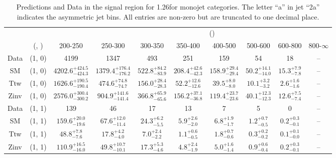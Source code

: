 \begin{table}[h!]
\tiny
\centering
\caption{Predictions and Data in the signal region for 1.26\ifb for monojet categories. The letter ``a'' in jet \eg ``2a''  indicates the asymmetric jet bins. All entries are non-zero but are truncated to one decimal place.\label{tab:predall_sig_comb_mono}}
\begin{tabular}
{cccccccccc}
	\hline\hline
&	&	& \multicolumn{8}{c}{\scalht (\gev)}\\ 
	&	 (\njet, \nb) & 200-250 & 250-300 & 300-350 & 350-400 & 400-500 & 500-600 & 600-800 & 800-$\infty$ \\ [0.8ex] 
\hline
	Data & (1, 0) & 4199 & 1347 & 493 & 251 & 159 & 54 & 18 & -- \\[0.5ex] 
	SM & (1, 0) & $4202.6^{+ 424.5 }_{- 424.3 }$ & $1379.4^{+ 176.4 }_{- 176.2 }$ & $522.8^{+ 84.2 }_{- 83.9 }$ & $208.4^{+ 42.6 }_{- 42.3 }$ & $158.9^{+ 29.4 }_{- 29.4 }$ & $50.2^{+ 14.1 }_{- 14.0 }$ & $15.3^{+ 7.9 }_{- 7.8 }$ & -- \\[0.5ex] 
	Ttw & (1, 0) & $1626.6^{+ 190.5 }_{- 190.4 }$ & $474.6^{+ 74.8 }_{- 74.7 }$ & $156.0^{+ 28.4 }_{- 28.3 }$ & $52.2^{+ 12.6 }_{- 12.6 }$ & $39.5^{+ 8.0 }_{- 8.0 }$ & $10.1^{+ 3.2 }_{- 3.2 }$ & $2.6^{+ 1.6 }_{- 1.6 }$ & -- \\[0.5ex] 
	Zinv & (1, 0) & $2576.0^{+ 300.4 }_{- 300.2 }$ & $904.9^{+ 141.6 }_{- 141.4 }$ & $366.8^{+ 65.9 }_{- 65.6 }$ & $156.2^{+ 37.1 }_{- 36.8 }$ & $119.4^{+ 23.7 }_{- 23.6 }$ & $40.1^{+ 12.3 }_{- 12.3 }$ & $12.6^{+ 7.5 }_{- 7.4 }$ & -- \\[0.5ex] 
	Data & (1, 1) & 139 & 46 & 17 & 13 & 7 & 5 & 0 & -- \\[0.5ex] 
	SM & (1, 1) & $159.6^{+ 20.0 }_{- 19.6 }$ & $67.6^{+ 12.0 }_{- 11.4 }$ & $24.3^{+ 6.2 }_{- 5.5 }$ & $5.9^{+ 2.6 }_{- 2.0 }$ & $6.8^{+ 1.9 }_{- 1.7 }$ & $1.2^{+ 0.7 }_{- 0.5 }$ & $0.2^{+ 0.3 }_{- 0.1 }$ & -- \\[0.5ex] 
	Ttw & (1, 1) & $48.8^{+ 7.8 }_{- 7.6 }$ & $17.8^{+ 4.2 }_{- 4.0 }$ & $7.0^{+ 2.4 }_{- 2.2 }$ & $1.1^{+ 0.6 }_{- 0.5 }$ & $1.8^{+ 0.7 }_{- 0.6 }$ & $0.3^{+ 0.2 }_{- 0.2 }$ & $0.1^{+ 0.1 }_{- 0.0 }$ & -- \\[0.5ex] 
	Zinv & (1, 1) & $110.9^{+ 16.5 }_{- 16.0 }$ & $49.8^{+ 10.7 }_{- 10.1 }$ & $17.3^{+ 5.3 }_{- 4.6 }$ & $4.8^{+ 2.4 }_{- 1.9 }$ & $5.0^{+ 1.6 }_{- 1.4 }$ & $0.9^{+ 0.6 }_{- 0.4 }$ & $0.2^{+ 0.3 }_{- 0.1 }$ & -- \\[0.5ex] 
	\hline
	\hline
\end{tabular}
\end{table}
